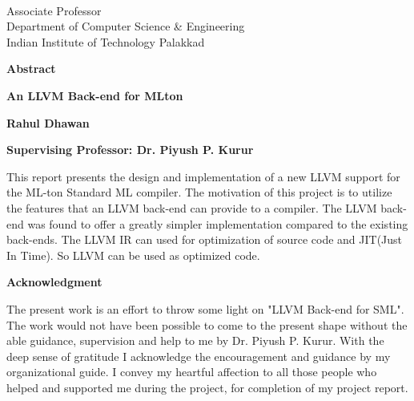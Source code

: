 \documentclass[openany]{book}
\begin{document}
\begin{flushright}
	\textbf{}\\
	Associate Professor \\
	Department of Computer Science \& Engineering \\
	Indian Institute of Technology Palakkad
\end{flushright}
\newpage


\begin{center}
    
    \huge{\textbf{Abstract}}
 
    \vspace{0.4cm}
    \large
    \textbf{An LLVM Back-end for MLton}
    
    \vspace{0.4cm}
    \textbf{Rahul Dhawan}
 
    \vspace{0.4cm}
    \textbf{Supervising Professor: Dr. Piyush P. Kurur }
    
    \vspace{1.0cm}
    \justify
    This report presents the design and implementation of a new LLVM support for the ML-ton Standard ML compiler. The motivation of this project is to utilize the features that an LLVM back-end can provide to a compiler.  The LLVM back-end was found to offer a greatly simpler implementation compared to the existing back-ends. The LLVM IR can used for optimization of source code and JIT(Just In Time). So LLVM can be used as optimized code. \newpage
\end{center}

\thispagestyle{plain}
\begin{center}
	
	\huge{\textbf{Acknowledgment}}
	\large
	\vspace{0.4cm}
	
	\vspace{1.0cm}
	The present work is an effort to throw some light on "LLVM Back-end for SML". The work would not have been possible to come to the present shape without the able guidance, supervision and help to me by Dr. Piyush P. Kurur. With the deep sense of gratitude I acknowledge the encouragement and guidance by my organizational guide. I convey my heartful affection to all those people who helped and supported me during the project, for completion of my project report.   
\end{center}

\hypersetup{
	colorlinks,
	citecolor=black,
	filecolor=black,
	linkcolor=black,
	urlcolor=black
}
\end{document}
